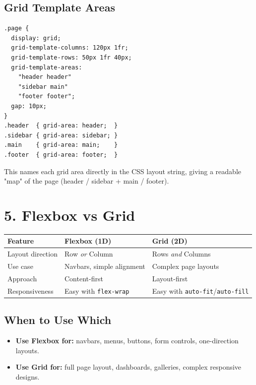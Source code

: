 \documentclass[12pt]{article}
\begin{document}
\subsection{Grid Template Areas}
\begin{lstlisting}
.page {
  display: grid;
  grid-template-columns: 120px 1fr;
  grid-template-rows: 50px 1fr 40px;
  grid-template-areas:
    "header header"
    "sidebar main"
    "footer footer";
  gap: 10px;
}
.header  { grid-area: header;  }
.sidebar { grid-area: sidebar; }
.main    { grid-area: main;    }
.footer  { grid-area: footer;  }
\end{lstlisting}
This names each grid area directly in the CSS layout string, giving a readable "map" of the page (header / sidebar + main / footer).

\section{5. Flexbox vs Grid}
\begin{center}
\begin{tabular}{lll}
\textbf{Feature} & \textbf{Flexbox (1D)} & \textbf{Grid (2D)} \\
\hline
Layout direction & Row \emph{or} Column & Rows \emph{and} Columns \\
Use case & Navbars, simple alignment & Complex page layouts \\
Approach & Content-first & Layout-first \\
Responsiveness & Easy with \texttt{flex-wrap} & Easy with \texttt{auto-fit}/\texttt{auto-fill} \\
\end{tabular}
\end{center}

\subsection{When to Use Which}
\begin{itemize}
    \item \textbf{Use Flexbox for:} navbars, menus, buttons, form controls, one-direction layouts.
    \item \textbf{Use Grid for:} full page layout, dashboards, galleries, complex responsive designs.
\end{itemize}
\end{document}
